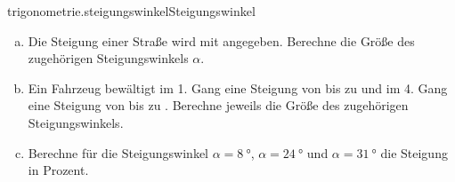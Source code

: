 \begin{exercise}{trigonometrie.steigungswinkel}{Steigungswinkel}
  \ifproblem\problem\par
    \begin{enumerate}[a)]
      \item Die Steigung einer Straße wird mit  angegeben. Berechne die Größe
            des zugehörigen Steigungswinkels $\alpha$.
      \item Ein Fahrzeug bewältigt im 1. Gang eine Steigung von bis zu  und
            im 4. Gang eine Steigung von bis zu . Berechne jeweils die Größe
            des zugehörigen Steigungswinkels.
      \item Berechne für die Steigungswinkel
            $\alpha=\SI{8}{\degree}$,
            $\alpha=\SI{24}{\degree}$ und
            $\alpha=\SI{31}{\degree}$
            die Steigung in Prozent.
    \end{enumerate}
  \fi
\end{exercise}

